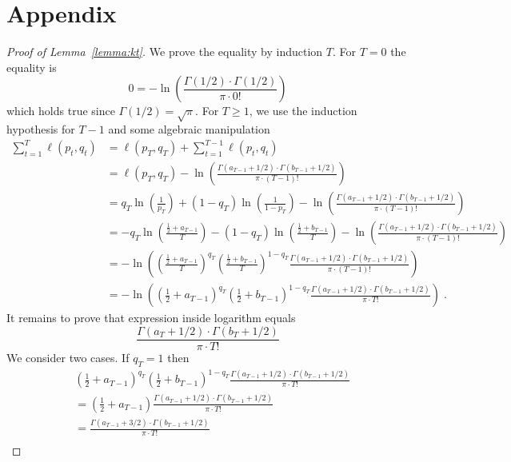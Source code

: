 \appendix
\section{Appendix}

\begin{proof}[Proof of Lemma~\ref{lemma:kt}]
We prove the equality by induction $T$. For $T=0$ the equality is
$$
0 = - \ln \left( \frac{\Gamma(1/2) \cdot \Gamma(1/2)}{\pi \cdot 0!} \right)
$$
which holds true since $\Gamma(1/2) = \sqrt{\pi}$.
For $T \ge 1$, we use the induction hypothesis for $T-1$ and some algebraic manipulation
\begin{align*}
\sum_{t=1}^T \ell(p_t, q_t)
& = \ell(p_T, q_T) + \sum_{t=1}^{T-1} \ell(p_t, q_t) \\
& = \ell(p_T, q_T) - \ln \left( \frac{\Gamma(a_{T-1} + 1/2) \cdot \Gamma(b_{T-1} + 1/2)}{\pi \cdot (T-1)!} \right) \\
& = q_T \ln\left( \frac{1}{p_T}\right) + (1-q_T) \ln  \left( \frac{1}{1 - p_T} \right) - \ln \left( \frac{\Gamma(a_{T-1} + 1/2) \cdot \Gamma(b_{T-1} + 1/2)}{\pi \cdot (T-1)!} \right) \\
& = - q_T \ln\left( \frac{\frac{1}{2} + a_{T-1}}{T} \right) - (1-q_T) \ln\left( \frac{\frac{1}{2} + b_{T-1}}{T} \right) - \ln \left( \frac{\Gamma(a_{T-1} + 1/2) \cdot \Gamma(b_{T-1} + 1/2)}{\pi \cdot (T-1)!} \right) \\
& = - \ln\left( \left( \frac{\frac{1}{2} + a_{T-1}}{T} \right)^{q_T} \left( \frac{\frac{1}{2} + b_{T-1}}{T} \right)^{1-q_T} \frac{\Gamma(a_{T-1} + 1/2) \cdot \Gamma(b_{T-1} + 1/2)}{\pi \cdot (T-1)!} \right) \\
& = - \ln\left( \left( \frac{1}{2} + a_{T-1} \right)^{q_T} \left( \frac{1}{2} + b_{T-1} \right)^{1-q_T} \frac{\Gamma(a_{T-1} + 1/2) \cdot \Gamma(b_{T-1} + 1/2)}{\pi \cdot T!}  \right) \; .
\end{align*}
It remains to prove that expression inside logarithm equals
$$
\frac{\Gamma(a_{T} + 1/2) \cdot \Gamma(b_T + 1/2)}{\pi \cdot T!}
$$
We consider two cases. If $q_T = 1$ then
\begin{align*}
& \left( \frac{1}{2} + a_{T-1} \right)^{q_T} \left( \frac{1}{2} + b_{T-1} \right)^{1-q_T} \frac{\Gamma(a_{T-1} + 1/2) \cdot \Gamma(b_{T-1} + 1/2)}{\pi \cdot T!} \\
& = \left( \frac{1}{2} + a_{T-1} \right) \frac{\Gamma(a_{T-1} + 1/2) \cdot \Gamma(b_{T-1} + 1/2)}{\pi \cdot T!} \\
& = \frac{\Gamma(a_{T-1} + 3/2) \cdot \Gamma(b_{T-1} + 1/2)}{\pi \cdot T!} \\

\end{align*}
\end{proof}
